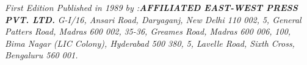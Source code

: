 \vskip 1.5cm
{\fontsize{9pt}{12pt}\selectfont
\noindent
{\it First Edition Published in 1989 by :\bfseries AFFILIATED EAST-WEST PRESS PVT. LTD.}
{\em G-I/16, Ansari Road, Daryaganj, New Delhi 110 002,}
{\em 5, General Patters Road, Madras 600 002,}
{\em 35-36, Greames Road, Madras 600 006,}
{\em 100, Bima Nagar (LIC Colony), Hyderabad 500 380,}
{\em 5, Lavelle Road, Sixth Cross, Bengaluru 560 001.}}\relax
